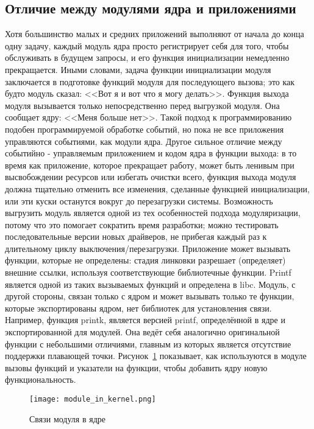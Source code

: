 \subsection{Отличие между модулями ядра и приложениями}
Хотя большинство малых и средних приложений выполняют от начала до конца одну задачу, каждый модуль ядра просто регистрирует себя для того, чтобы обслуживать в будущем запросы, и его функция инициализации немедленно прекращается. Иными словами, задача функции инициализации модуля заключается в подготовке функций модуля для последующего вызова; это как будто модуль сказал: <<Вот я и вот что я могу делать>>. Функция выхода модуля  вызывается только непосредственно перед выгрузкой модуля. Она сообщает ядру: <<Меня больше нет>>. Такой подход к программированию подобен программируемой обработке событий, но пока не все приложения управляются событиями, как модули ядра. Другое сильное отличие между событийно - управляемым приложением и кодом ядра в функции выхода: в то время как приложение, которое прекращает работу, может быть ленивым при высвобождении ресурсов или избегать очистки всего, функция выхода модуля должна тщательно отменить все изменения, сделанные функцией инициализации, или эти куски останутся вокруг до перезагрузки системы. 
Возможность выгрузить модуль является одной из тех особенностей подхода модуляризации, потому что это помогает сократить время разработки; можно тестировать последовательные версии новых драйверов, не прибегая каждый раз к длительному циклу выключения/перезагрузки. 
Приложение может вызывать функции, которые не определены: стадия линковки разрешает (определяет) внешние ссылки, используя соответствующие библиотечные функции. Printf является одной из таких вызываемых функций и определена в libc. Модуль, с другой стороны, связан только с ядром и может вызывать только те функции, которые экспортированы ядром, нет библиотек для установления связи. Например, функция printk, является версией printf, определённой в ядре и экспортированной для модулей. Она ведёт себя аналогично оригинальной функции с небольшими отличиями, главным из которых является отсутствие поддержки плавающей точки. Рисунок~\ref{image:module_in_kernel} показывает, как используются в модуле вызовы функций и указатели на функции, чтобы добавить ядру новую функциональность. \cite{ldd}

\begin{figure}[h]
  \centering
  \texttt{[image: module\_in\_kernel.png]}
  \caption{Связи модуля в ядре}
  \label{image:module_in_kernel}
\end{figure}

